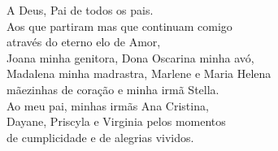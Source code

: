 \newpage
\thispagestyle{empty}

\vspace*{15cm}

\begin{flushright}
{\large {A Deus, Pai de todos os pais.}}\\
{\large {Aos que partiram mas que continuam comigo}}\\
{\large {atrav{\'e}s do eterno elo de Amor,}}\\
{\large {Joana minha genitora, Dona Oscarina minha av{\'o},}}\\
{\large {Madalena minha madrastra, Marlene e Maria Helena }}\\
{\large {m{\~a}ezinhas de cora{\c c}{\~a}o e minha irm{\~a} Stella.}}\\
{\large {Ao meu pai, minhas irm{\~a}s Ana Cristina, }}\\
{\large {Dayane, Priscyla e Virginia pelos momentos}}\\
{\large {de cumplicidade e de alegrias vividos.}}\\
\end{flushright}
